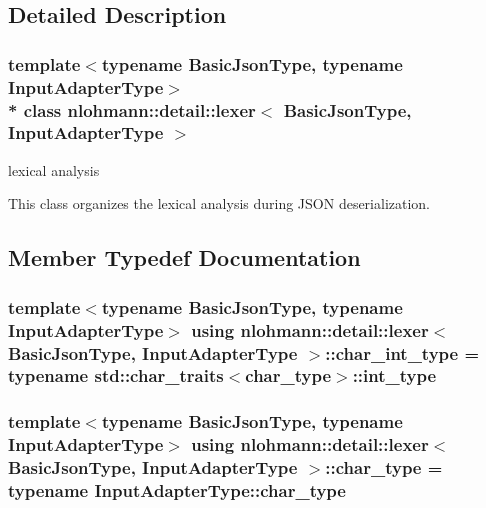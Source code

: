 \subsection{Detailed Description}
\subsubsection*{template$<$typename Basic\+Json\+Type, typename Input\+Adapter\+Type$>$\\*
class nlohmann\+::detail\+::lexer$<$ Basic\+Json\+Type, Input\+Adapter\+Type $>$}

lexical analysis 

This class organizes the lexical analysis during J\+S\+ON deserialization. 

\subsection{Member Typedef Documentation}
\subsubsection[{\texorpdfstring{char\+\_\+int\+\_\+type}{char_int_type}}]{\setlength{\rightskip}{0pt plus 5cm}template$<$typename Basic\+Json\+Type, typename Input\+Adapter\+Type$>$ using {\bf nlohmann\+::detail\+::lexer}$<$ Basic\+Json\+Type, Input\+Adapter\+Type $>$\+::{\bf char\+\_\+int\+\_\+type} =  typename std\+::char\+\_\+traits$<${\bf char\+\_\+type}$>$\+::int\+\_\+type\hspace{0.3cm}{\ttfamily [private]}}\hypertarget{classnlohmann_1_1detail_1_1lexer_a46612a81a07dbbc6daef870ca4f959e4}{}\label{classnlohmann_1_1detail_1_1lexer_a46612a81a07dbbc6daef870ca4f959e4}
\subsubsection[{\texorpdfstring{char\+\_\+type}{char_type}}]{\setlength{\rightskip}{0pt plus 5cm}template$<$typename Basic\+Json\+Type, typename Input\+Adapter\+Type$>$ using {\bf nlohmann\+::detail\+::lexer}$<$ Basic\+Json\+Type, Input\+Adapter\+Type $>$\+::{\bf char\+\_\+type} =  typename Input\+Adapter\+Type\+::char\+\_\+type\hspace{0.3cm}{\ttfamily [private]}}\hypertarget{classnlohmann_1_1detail_1_1lexer_a98c69ad433d971104288baef813b2c68}{}\label{classnlohmann_1_1detail_1_1lexer_a98c69ad433d971104288baef813b2c68}
